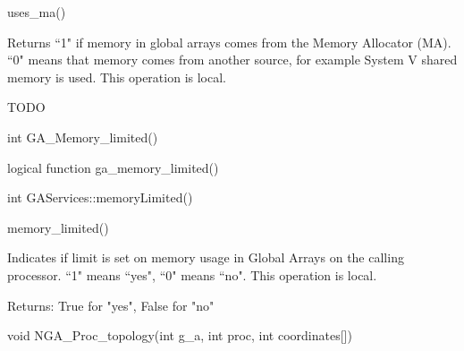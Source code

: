 \documentclass[12pt]{article}
\begin{document}
\begin{pyapi}
\begin{pycode}
uses_ma()
\end{pycode}
\end{pyapi}

\local

\begin{desc}

Returns ``1" if memory in global arrays comes from the Memory Allocator (MA).
``0" means that memory comes from another source, for example System V shared
memory is used.
This operation is local.

TODO
\end{desc}


\begin{capi}
\begin{ccode}
int GA_Memory_limited()
\end{ccode}
\end{capi}

\begin{fapi}
\begin{fcode}
logical function ga_memory_limited()
\end{fcode}
\end{fapi}

\begin{cxxapi}
\begin{cxxcode}
int GAServices::memoryLimited()
\end{cxxcode}
\end{cxxapi}

\begin{pyapi}
\begin{pycode}
memory_limited()
\end{pycode}
\end{pyapi}
\local

\begin{desc}

Indicates if limit is set on memory usage in Global Arrays on the calling processor.
``1" means ``yes", ``0" means ``no".
This operation is local.

Returns:
True for "yes", False for "no"
\end{desc}


\begin{capi}
\begin{ccode}
void NGA_Proc_topology(int g_a, int proc, int coordinates[])
\end{ccode}
\begin{funcargs}
\end{funcargs}
\end{capi}
\end{document}
